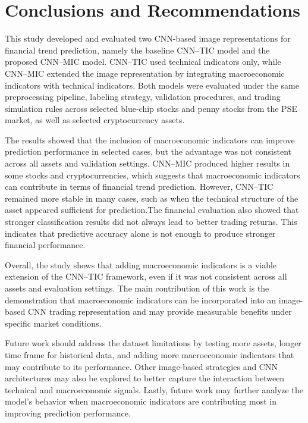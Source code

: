 \chapter{Conclusions and Recommendations}

This study developed and evaluated two CNN-based image representations for financial trend prediction, namely the baseline CNN--TIC model and the proposed CNN--MIC model. CNN--TIC used technical indicators only, while CNN--MIC extended the image representation by integrating macroeconomic indicators with technical indicators. Both models were evaluated under the same preprocessing pipeline, labeling strategy, validation procedures, and trading simulation rules across selected blue-chip stocks and penny stocks from the PSE market, as well as selected cryptocurrency assets.

The results showed that the inclusion of macroeconomic indicators can improve prediction performance in selected cases, but the advantage was not consistent across all assets and validation settings. CNN--MIC produced higher results in some stocks and cryptocurrencies, which suggests that macroeconomic indicators can contribute in terms of financial trend prediction. However, CNN--TIC remained more stable in many cases, such as when the technical structure of the asset appeared sufficient for prediction.The financial evaluation also showed that stronger classification results did not always lead to better trading returns. This indicates that predictive accuracy alone is not enough to produce stronger financial performance.

Overall, the study shows that adding macroeconomic indicators is a viable extension of the CNN--TIC framework, even if it was not consistent across all assets and evaluation settings. The main contribution of this work is the demonstration that macroeconomic indicators can be incorporated into an image-based CNN trading representation and may provide measurable benefits under specific market conditions.

Future work should address the dataset limitations by testing more assets, longer time frame for historical data, and adding more macroeconomic indicators that may contribute to its performance. Other image-based strategies and CNN architectures may also be explored to better capture the interaction between technical and macroeconomic signals. Lastly, future work may further analyze the model’s behavior when macroeconomic indicators are contributing most in improving prediction performance.